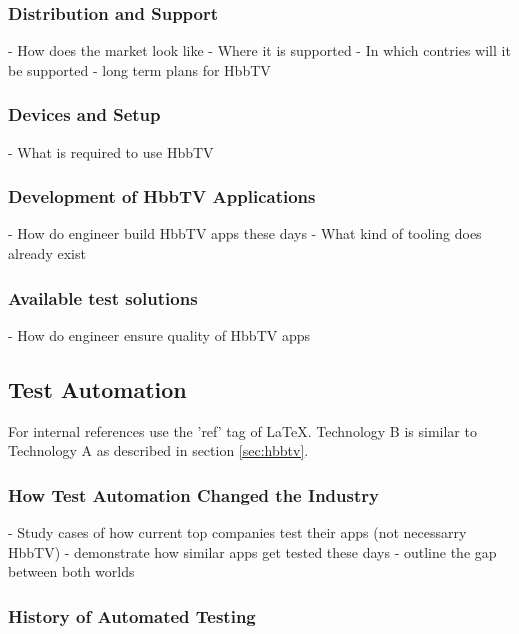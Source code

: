 \subsubsection{Distribution and Support\label{sec:distandsup}}

- How does the market look like
- Where it is supported
- In which contries will it be supported
- long term plans for HbbTV

\subsubsection{Devices and Setup\label{sec:deviceandsetup}}

- What is required to use HbbTV

\subsubsection{Development of HbbTV Applications\label{sec:devofhbbtv}}

- How do engineer build HbbTV apps these days
- What kind of tooling does already exist

\subsubsection{Available test solutions\label{sec:availabletestsolutions}}

- How do engineer ensure quality of HbbTV apps

\subsection{Test Automation\label{sec:testautomation}}

For internal references use the 'ref' tag of LaTeX. Technology B is similar to Technology A
as described in section \ref{sec:hbbtv}.

\subsubsection{How Test Automation Changed the Industry\label{sec:howitchanged}}

- Study cases of how current top companies test their apps (not necessarry HbbTV)
- demonstrate how similar apps get tested these days
- outline the gap between both worlds

\subsubsection{History of Automated Testing\label{sec:history}}

